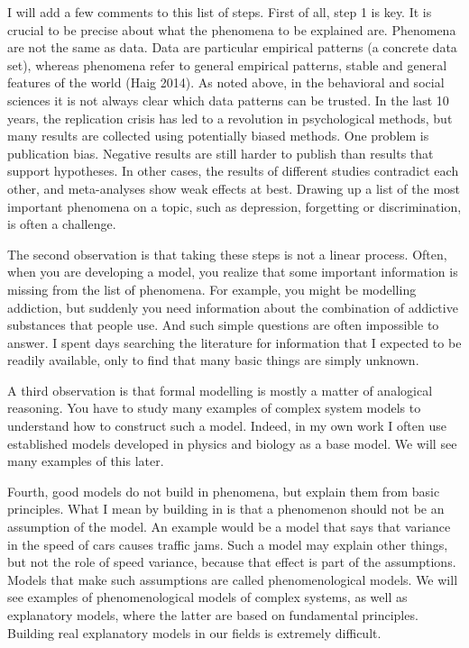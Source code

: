 \documentclass[
  a4paper,
  DIV=11,
  numbers=noendperiod]{scrreprt}
\begin{document}
I will add a few comments to this list of steps. First of all, step 1 is
key. It is crucial to be precise about what the phenomena to be
explained are. Phenomena are not the same as data. Data are particular
empirical patterns (a concrete data set), whereas phenomena refer to
general empirical patterns, stable and general features of the world
(Haig 2014). As noted above, in the behavioral and social sciences it is
not always clear which data patterns can be trusted. In the last 10
years, the replication crisis has led to a revolution in psychological
methods, but many results are collected using potentially biased
methods. One problem is publication bias. Negative results are still
harder to publish than results that support hypotheses. In other cases,
the results of different studies contradict each other, and
meta-analyses show weak effects at best. Drawing up a list of the most
important phenomena on a topic, such as depression, forgetting or
discrimination, is often a challenge.

The second observation is that taking these steps is not a linear
process. Often, when you are developing a model, you realize that some
important information is missing from the list of phenomena. For
example, you might be modelling addiction, but suddenly you need
information about the combination of addictive substances that people
use. And such simple questions are often impossible to answer. I spent
days searching the literature for information that I expected to be
readily available, only to find that many basic things are simply
unknown.

A third observation is that formal modelling is mostly a matter of
analogical reasoning. You have to study many examples of complex system
models to understand how to construct such a model. Indeed, in my own
work I often use established models developed in physics and biology as
a base model. We will see many examples of this later.

Fourth, good models do not build in phenomena, but explain them from
basic principles. What I mean by building in is that a phenomenon should
not be an assumption of the model. An example would be a model that says
that variance in the speed of cars causes traffic jams. Such a model may
explain other things, but not the role of speed variance, because that
effect is part of the assumptions. Models that make such assumptions are
called phenomenological models. We will see examples of phenomenological
models of complex systems, as well as explanatory models, where the
latter are based on fundamental principles. Building real explanatory
models in our fields is extremely difficult.
\end{document}
